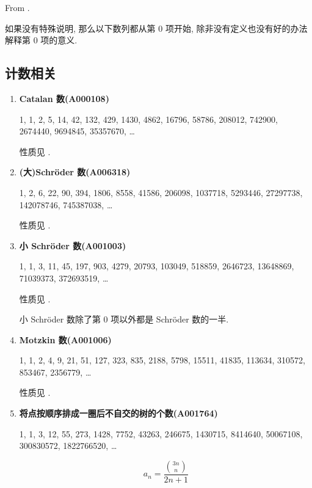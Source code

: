 From \cite{antileafstandard}.

如果没有特殊说明, 那么以下数列都从第 \(0\) 项开始, 除非没有定义也没有好的办法解释第 \(0\) 项的意义.

\subsection{计数相关}

\begin{enumerate}
    \item \textbf{Catalan 数(A000108)}
          
          1, 1, 2, 5, 14, 42, 132, 429, 1430, 4862, 16796, 58786, 208012, 742900, 2674440, 9694845, 35357670, \dots
          
          性质见 .
          
    \item \textbf{(大)Schr\"oder 数(A006318)}
          
          1, 2, 6, 22, 90, 394, 1806, 8558, 41586, 206098, 1037718, 5293446, 27297738, 142078746, 745387038, \dots
          
          性质见 .
          
    \item \textbf{小 Schr\"oder 数(A001003)}
          
          1, 1, 3, 11, 45, 197, 903, 4279, 20793, 103049, 518859, 2646723, 13648869, 71039373, 372693519, \dots
          
          性质见 .
          
          小 Schr\"oder 数除了第 \(0\) 项以外都是 Schr\"oder 数的一半.
          
    \item \textbf{Motzkin 数(A001006)}
          
          1, 1, 2, 4, 9, 21, 51, 127, 323, 835, 2188, 5798, 15511, 41835, 113634, 310572, 853467, 2356779, \dots
          
          性质见 .
          
    \item \textbf{将点按顺序排成一圈后不自交的树的个数(A001764)}
          
          1, 1, 3, 12, 55, 273, 1428, 7752, 43263, 246675, 1430715, 8414640, 50067108, 300830572, 1822766520, \dots
          
          \[
              a_n = \frac {{3n \choose n}} {2n + 1}
          \]
          

\end{enumerate}
